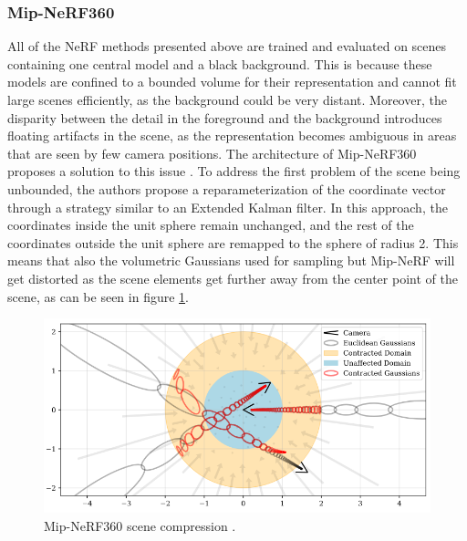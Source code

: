\subsubsection{Mip-NeRF360}
All of the NeRF methods presented above are trained and evaluated on scenes containing one central model and a black background. This is because these models are confined to a bounded volume for their representation and cannot fit large scenes efficiently, as the background could be very distant. Moreover, the disparity between the detail in the foreground and the background introduces floating artifacts in the scene, as the representation becomes ambiguous in areas that are seen by few camera positions. The architecture of Mip-NeRF360 proposes a solution to this issue \cite{barron2022mipnerf360}. To address the first problem of the scene being unbounded, the authors propose a reparameterization of the coordinate vector through a strategy similar to an Extended Kalman filter. In this approach, the coordinates inside the unit sphere remain unchanged, and the rest of the coordinates outside the unit sphere are remapped to the sphere of radius 2. This means that also the volumetric Gaussians used for sampling but Mip-NeRF will get distorted as the scene elements get further away from the center point of the scene, as can be seen in figure \ref{fig:mipnerf360-scene}.

\begin{figure}[H]
    \centering
    \includegraphics[width=0.5\linewidth]{figures/mipnerf360-scene.png}
    \caption{Mip-NeRF360 scene compression \cite{barron2022mipnerf360}.}
    \label{fig:mipnerf360-scene}
\end{figure}


